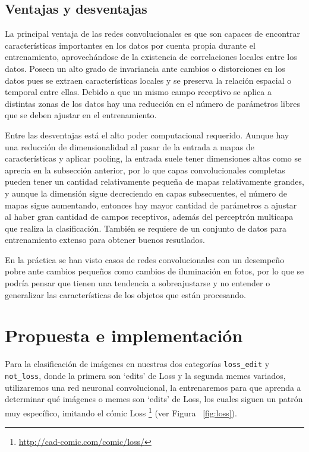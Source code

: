 \documentclass[spanish,11pt,letterpaper]{article}
\begin{document}
\subsection{Ventajas y desventajas}

La principal ventaja de las redes convolucionales es que son capaces de encontrar
características importantes en los datos por cuenta propia durante el entrenamiento,
aprovechándose de la existencia de correlaciones locales entre los datos. Poseen
un alto grado de invariancia ante cambios o distorciones en los datos pues
se extraen características locales y se preserva la relación espacial o temporal
entre ellas. Debido a que un mismo campo receptivo se aplica a distintas zonas de
los datos hay una reducción en el número de parámetros libres que se
deben ajustar en el entrenamiento\cite{haykin}.

Entre las desventajas está el alto poder computacional requerido. Aunque hay una
reducción de dimensionalidad al pasar de la entrada a mapas de características y
aplicar pooling, la entrada suele tener dimensiones altas como se aprecia en la subsección
anterior, por lo que capas convolucionales completas pueden tener un cantidad
relativamente pequeña de mapas relativamente grandes, y aunque la dimensión sigue
decreciendo en capas subsecuentes, el número de mapas sigue aumentando, entonces
hay mayor cantidad de parámetros a ajustar al haber gran cantidad de campos receptivos,
además del perceptrón multicapa que realiza la clasificación. También se requiere
de un conjunto de datos para entrenamiento extenso para obtener buenos resutlados.

En la práctica se han visto casos de redes convolucionales con un desempeño pobre
ante cambios pequeños como cambios de iluminación en fotos, por lo que se podría
pensar que tienen una tendencia a sobreajustarse y no entender o generalizar las
características de los objetos que están procesando\cite{limitations}.

\section{Propuesta e implementación}

Para la clasificación de imágenes en nuestras dos categorías \texttt{loss\_edit}
y \texttt{not\_loss}, donde la primera son `edits' de Loss y la segunda memes
variados, utilizaremos una red neuronal convolucional, la entrenaremos para que
aprenda a determinar qué imágenes o memes son `edits' de Loss, los cuales siguen
un patrón muy específico, imitando el cómic Loss%
\footnote{\url{http://cad-comic.com/comic/loss/}} (ver Figura ~\ref{fig:loss}).
\end{document}
